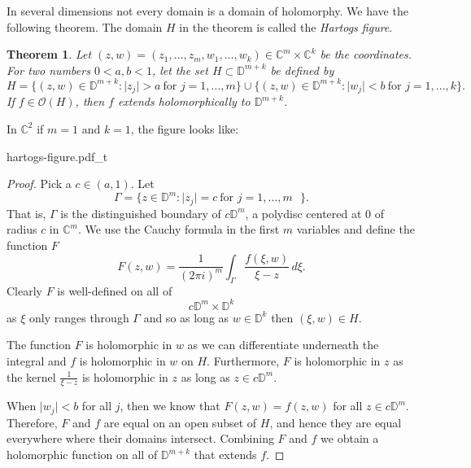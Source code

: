 \documentclass[12pt,openany]{book}
\newcommand{\sabs}[1]{\lvert {#1} \rvert}
\newcommand{\C}{{\mathbb{C}}}
\newcommand{\D}{{\mathbb{D}}}
\newcommand{\sO}{{\mathscr{O}}}
\newcommand{\myindex}[1]{#1\index{#1}}
\theoremstyle{plain}
\newtheorem{thm}{Theorem}[section]
\theoremstyle{remark}
\theoremstyle{definition}
\theoremstyle{exercise}
\theoremstyle{example}
\begin{document}
In several dimensions not every domain is a domain of holomorphy.  We have
the following theorem.  The domain $H$ in the theorem is called the
\emph{\myindex{Hartogs figure}}.

\begin{thm} \label{thm:extensionhartogsfigure}
Let $(z,w) = (z_1,\ldots,z_m,w_{1},\ldots,w_{k}) \in \C^m \times \C^k$ be the coordinates.  For two numbers
$0 < a,b < 1$, let the set $H \subset \D^{m+k}$
be defined by
\begin{equation*}
H = \bigl\{ (z,w) \in \D^{m+k} : \sabs{z_j} > a ~\text{for $j=1,\ldots,m$}
\bigr\} \cup
\bigl\{ (z,w) \in \D^{m+k} : \sabs{w_j} < b ~\text{for $j=1,\ldots,k$}
\bigr\} .
\end{equation*}
If $f \in \sO(H)$, then $f$ extends holomorphically to $\D^{m+k}$.
\end{thm}

\begin{samepage}
In $\C^2$ if $m=1$ and $k=1$, the figure looks like:


\newcommand{\hartogstext}{\parbox[t]{2.5in}{In diagrams, often the Hartogs figure is
drawn as:}}
\begin{center}
{hartogs-figure.pdf_t}
\end{center}
\end{samepage}



\begin{proof}
Pick a $c \in (a,1)$.  Let
\begin{equation*}
\Gamma =
\bigl\{ z \in \D^{m} : \sabs{z_j} = c ~\text{for $j=1,\ldots,m$ } \bigr\}.
\end{equation*}
That is, $\Gamma$ is the distinguished boundary of $c \D^m$,
a polydisc centered at 0 of radius $c$ in $\C^m$.
We use the Cauchy formula in the first $m$ variables and
define the function $F$
\begin{equation*}
F(z,w)
=
\frac{1}{{(2\pi i)}^m}
\int_\Gamma \frac{f(\xi,w)}{\xi-z} \, d\xi .
\end{equation*}
Clearly $F$ is well-defined on all of
\begin{equation*}
c\D^m \times \D^k
\end{equation*}
as $\xi$ only
ranges through $\Gamma$ and so as long as $w \in \D^k$ then $(\xi,w) \in H$.

The function $F$ is holomorphic in $w$ as we can differentiate
underneath the integral and $f$ is holomorphic in $w$ on $H$.  Furthermore,
$F$ is holomorphic in $z$ as the kernel $\frac{1}{\xi-z}$ is holomorphic in
$z$ as long as $z \in c\D^m$.

When $\sabs{w_j} < b$ for all $j$, then we know that $F(z,w) = f(z,w)$
for all $z \in c \D^m$.  Therefore, $F$ and $f$ are equal on an open subset
of $H$, and hence they are equal everywhere where their domains intersect.
Combining $F$ and $f$ we obtain a holomorphic
function on all of $\D^{m+k}$ that extends $f$.
\end{proof}
\end{document}
